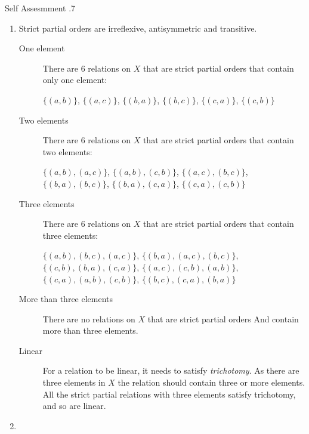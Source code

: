 \documentclass[\main/notes.tex]{subfiles}
\begin{document}
				\begin{exercise}{Self Assesmment \thechapter.7}
					\begin{enumerate}
						\item {}
							Strict partial orders are irreflexive, antisymmetric and transitive.
							\begin{description}
								\item[One element] There are $6$ relations on $X$ that are strict partial orders that contain only one element:
									\begin{center}
										$ \bigl\{(a, b)\bigr\}$, $\bigl\{(a, c)\bigr\}$, $\bigl\{(b, a)\bigr\}$, $\bigl\{(b, c)\bigr\}$, $\bigl\{(c, a)\bigr\}$, $\bigl\{(c, b)\bigr\}$
									\end{center}
								\item[Two elements] There are $6$ relations on $X$ that are strict partial orders that contain two elements:
									\begin{center}
										$ \bigl\{(a, b), (a, c)\bigr\}$, $ \bigl\{(a, b), (c, b)\bigr\}$, $ \bigl\{(a, c), (b, c)\bigr\}$, $ \bigl\{(b, a), (b, c)\bigr\}$, $ \bigl\{(b, a), (c, a)\bigr\}$, $\bigl\{(c, a), (c, b)\bigr\}$
									\end{center}
								\tcbbreak
								\item[Three elements] There are $6$ relations on $X$ that are strict partial orders that contain three elements:
									\begin{center}
										$\bigl\{(a, b), (b, c), (a, c)\bigr\}$, $\bigl\{(b, a), (a, c), (b, c)\bigr\}$, $\bigl\{(c, b), (b, a), (c, a)\bigr\}$, $\bigl\{(a, c), (c, b), (a, b)\bigr\}$, $\bigl\{(c, a), (a, b), (c, b)\bigr\}$, $\bigl\{(b, c), (c, a), (b, a)\bigr\}$
									\end{center}
								\item[More than three elements] There are no relations on $X$ that are strict partial orders And contain more than three elements.
								\item[Linear] For a relation to be linear, it needs to satisfy \emph{trichotomy}. As there are three elements in $X$ the relation should contain three or more elements.\\
									All the strict partial relations with three elements satisfy trichotomy, and so are linear. 
							\end{description}
						\item {}

\end{enumerate}
\end{exercise}
\end{document}
